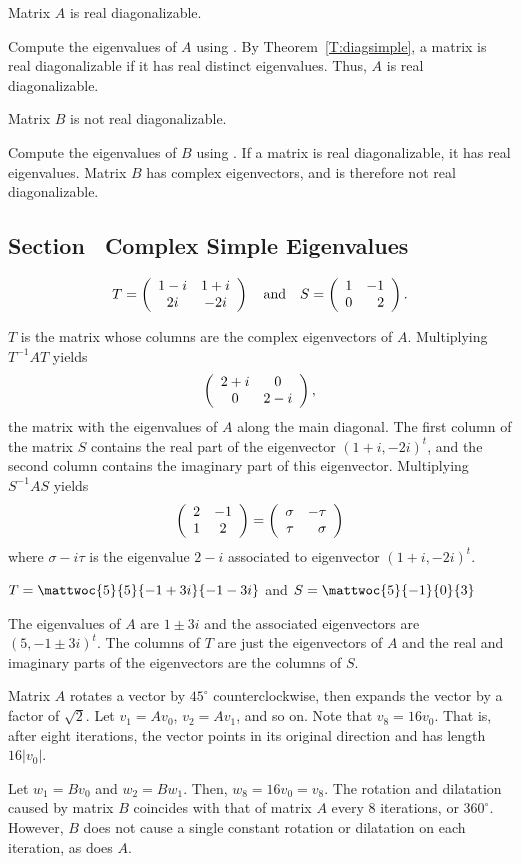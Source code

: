 \ans Matrix $A$ is real diagonalizable.

\soln Compute the eigenvalues of $A$ using \Matlabp.  By
Theorem~\ref{T:diagsimple}, a matrix is real diagonalizable if it has
real distinct eigenvalues.  Thus, $A$ is real diagonalizable.

\ans Matrix $B$ is not real diagonalizable.

\soln Compute the eigenvalues of $B$ using \Matlabp.  If a matrix is
real diagonalizable, it has real eigenvalues.  Matrix $B$ has complex
eigenvectors, and is therefore not real diagonalizable.


\subsection*{Section~\protect{\ref{S:CSE}} Complex Simple Eigenvalues}

\ans
\[
T = \left(\begin{array}{cc} 1 - i & 1 + i\\ 2i &-2i\end{array}\right)
\quad\mbox{and}\quad S = \left(\begin{array}{rr} 1 & -1\\ 0 &2\end{array}\right).
\]

\soln $T$ is the matrix whose columns are the complex eigenvectors
of $A$.  Multiplying $T^{-1}AT$ yields
\[
\left(\begin{array}{cc} 2 + i & 0\\ 0 &2 - i\end{array}\right),
\]
the matrix with the eigenvalues of $A$ along the main diagonal.  The
first column of the matrix $S$ contains the real part of the eigenvector
$(1 + i, -2i)^t$, and the second column contains the imaginary part of
this eigenvector. Multiplying $S^{-1}AS$ yields
\[
\left(\begin{array}{cc} 2 & -1\\ 1 &2\end{array}\right) = \left(\begin{array}{rr} \sigma & -\tau\\ \tau &\sigma\end{array}\right)
\]
where $\sigma - i\tau$ is the eigenvalue $2 - i$ associated to
eigenvector $(1 + i, -2i)^t$.

\ans $T = \mattwoc{5}{5}{-1+3i}{-1-3i}$ and $S=\mattwoc{5}{-1}{0}{3}$ 

\soln The eigenvalues of $A$ are $1\pm 3i$ and the associated eigenvectors 
are $(5,-1\pm 3i)^t$.  The columns of $T$ are just the eigenvectors of $A$
and the real and imaginary parts of the eigenvectors are the columns of $S$. 


Matrix $A$ rotates a vector by $45^{\circ}$ counterclockwise, then expands
the vector by a factor of $\sqrt{2}$.  Let $v_1 = Av_0$, $v_2 =
Av_1$, and so on.  Note that $v_8 = 16v_0$.  That is, after eight
iterations, the vector points in its original direction and has length
$16|v_0|$.

\para Let $w_1 = Bv_0$ and $w_2 = Bw_1$.  Then, $w_8 = 16v_0
= v_8$.  The rotation and dilatation caused by matrix $B$ coincides
with that of matrix $A$ every 8 iterations, or $360^\circ$.  However,
$B$ does not cause a single constant rotation or dilatation on each
iteration, as does $A$.

